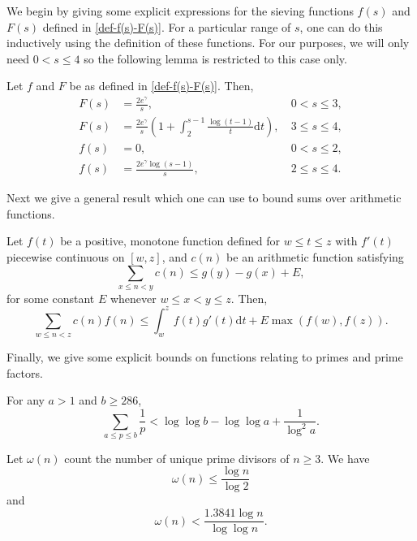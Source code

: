 \documentclass[12pt]{amsart}
\begin{document}
We begin by giving some explicit expressions for the sieving functions $f(s)$ and $F(s)$ defined in \eqref{def-f(s)-F(s)}. For a particular range of $s$, one can do this inductively using the definition of these functions. For our purposes, we will only need $0<s\le 4$ so the following lemma is restricted to this case only.
\begin{lemma} \label{lem: estimetes-f-F}
    Let $f$ and $F$ be as defined in \eqref{def-f(s)-F(s)}. Then,
    \begin{align}
        F(s)&=\frac{2e^{\gamma}}{s}, ~&0 < s \le 3,\label{eq: approx-F03}\\
        F(s)&=\frac{2e^{\gamma}}{s} \left( 1 + \int_2^{s-1} \frac{\log(t-1)}{t} \mathrm{d}t \right), ~&3 \le s \le 4,\label{eq: approx-F34}\\
        f(s)&= 0, ~&0 < s \le 2,\label{eq: approx-f02}\\
        f(s)&=\frac{2e^{\gamma} \log(s-1)}{s}, ~&2 \le s \le 4.\label{eq: approx-f24}
    \end{align}
\end{lemma}
Next we give a general result which one can use to bound sums over arithmetic functions.
\begin{lemma}
\label{lemma:sump}
Let $f(t)$ be a positive, monotone function defined for $w \le t \le z$ with $f'(t)$ piecewise continuous on $[w,z]$, and $c(n)$ be an arithmetic function satisfying 
\begin{equation*}
\sum_{x\le n <y}c(n) \le g(y)-g(x)+E,
\end{equation*}
for some constant $E$ whenever $w \le x < y \leq z$. Then,
\begin{equation*}
\sum_{w\le n <z}c(n)f(n)\le \int_w^z f(t)g'(t)\mathrm{d}t+E\max \left(f(w),f(z)\right).
\end{equation*}
\end{lemma}
Finally, we give some explicit bounds on functions relating to primes and prime factors.
\begin{lemma}\label{1plem}
    For any $a>1$ and $b\ge 286$,
    \begin{equation}
    \label{eq:s1/p}
        \sum_{a \le p \le b}\frac{1}{p}<\log \log b -\log \log a+\frac{1}{\log^2 a}.
    \end{equation}
\end{lemma}
\begin{lemma}\label{omegalem}
    Let $\omega(n)$ count the number of unique prime divisors of $n\ge 3$. We have
    \begin{equation}\label{wntriv}
        \omega(n)\le\frac{\log n}{\log 2}
    \end{equation}
    and
    \begin{equation}
    \label{eq:w(n)}
        \omega(n)< \frac{1.3841\log n}{\log \log n}.
    \end{equation}
\end{lemma}
\end{document}
